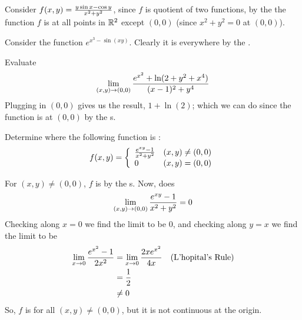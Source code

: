 \documentclass[english, 11pt]{article}
\begin{document}
  \begin{exmp}
    Consider $f(x,y) = \frac{y\sin x - \cos y}{x^2+y^2}$, since $f$ is quotient of two  functions, by the  the function $f$ is  at all points in ${\mathbb{R}}^2$ except $(0,0)$ (since $x^2 + y^2 = 0$ at $(0,0)$).
  \end{exmp}

  \begin{exmp}
    Consider the function $e^{x^3 - \sin(xy)}$.
    Clearly it is  everywhere by the .
  \end{exmp}

  \begin{exmp}
    Evaluate
    \[ \lim_{(x,y)\rightarrow(0,0)} \frac{e^{x^2} + \ln(2+y^2+x^4)}{(x-1)^2 + y^4} \]
    Plugging in $(0,0)$ gives us the result, $1+\ln(2)$; which we can do since the function is  at $(0,0)$ by the s.
  \end{exmp}

  \begin{exmp}
    Determine where the following function is :
    \[ f(x,y) = \left\{ \begin{array}{lr} \frac{e^{xy} - 1}{x^2 + y^2} & \mbox{$(x,y) \not = (0,0)$} \\ 0 & \mbox{$(x,y)=(0,0)$} \end{array} \right. \]
  \end{exmp}

  For $(x,y) \not = (0,0)$, $f$ is  by the s. Now, does
  \[ \lim_{(x,y) \rightarrow (0,0)} \frac{e^{xy}-1}{x^2 + y^2} = 0 \]
  Checking along $x=0$ we find the limit to be 0, and checking along $y=x$ we find the limit to be
  \begin{align*}
    \lim_{x\rightarrow 0} \frac{e^{x^2} -1}{2x^2} & = \lim_{x\rightarrow 0} \frac{2xe^{x^2}}{4x} & \mbox{(L'hopital's Rule)} \\
    & = \frac{1}{2} \\
    & \not = 0
  \end{align*}
  So, $f$ is  for all $(x,y) \not = (0,0)$, but it is not continuous at the origin.
\end{document}
